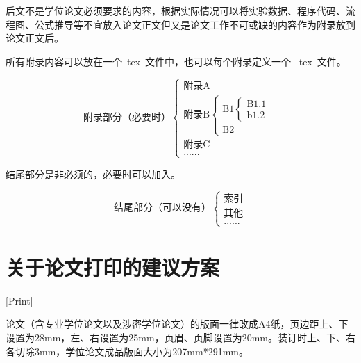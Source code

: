 后文不是学位论文必须要求的内容，根据实际情况可以将实验数据、程序代码、流程图、公式推导等不宜放入论文正文但又是论文工作不可或缺的内容作为附录放到论文正文后。

所有附录内容可以放在一个~tex~文件中，也可以每个附录定义一个 ~tex~文件。

\[
  \text{附录部分（必要时）}
  \begin{cases}
    \text{附录A}               \\
    \text{附录B}
    \begin{cases}
      \text{B1}
      \begin{cases}
        \text{B1.1} \\
        \text{b1.2}
      \end{cases} \\
      \text{B2}
    \end{cases} \\
    \text{附录C}               \\
    \text{......}
  \end{cases}
\]

结尾部分是非必须的，必要时可以加入。

\[
  \text{结尾部分（可以没有）}
  \begin{cases}
    \text{索引} \\
    \text{其他} \\
    \text{......}
  \end{cases}
\]

\chapter{关于论文打印的建议方案}[Print]

论文（含专业学位论文以及涉密学位论文）的版面一律改成A4纸，页边距上、下设置为28mm，左、右设置为25mm，页眉、页脚设置为20mm。装订时上、下、右各切除3mm，学位论文成品版面大小为207mm*291mm。

